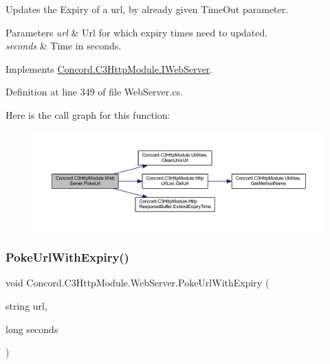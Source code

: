 Updates the Expiry of a url, by already given Time\+Out parameter. 


\begin{DoxyParams}{Parameters}
{\em url} & Url for which expiry times need to updated.\\
\hline
{\em seconds} & Time in seconds.\\
\hline
\end{DoxyParams}


Implements \mbox{\hyperlink{interface_concord_1_1_c3_http_module_1_1_i_web_server_a54d1254c7264250739d47175c1d1929d}{Concord.\+C3\+Http\+Module.\+I\+Web\+Server}}.



Definition at line 349 of file Web\+Server.\+cs.

Here is the call graph for this function\+:
\nopagebreak
\begin{figure}[H]
\begin{center}
\leavevmode
\includegraphics[width=350pt]{class_concord_1_1_c3_http_module_1_1_web_server_ad58516396d74972ad8f1005c889e1379_cgraph}
\end{center}
\end{figure}
\mbox{\label{class_concord_1_1_c3_http_module_1_1_web_server_ad3121bff4e1aeaeb05a5f1636d1e7d65}} 
\subsubsection{\texorpdfstring{PokeUrlWithExpiry()}{PokeUrlWithExpiry()}}
{\footnotesize\ttfamily void Concord.\+C3\+Http\+Module.\+Web\+Server.\+Poke\+Url\+With\+Expiry (\begin{DoxyParamCaption}\item[{string}]{url,  }\item[{long}]{seconds }\end{DoxyParamCaption})\hspace{0.3cm}{\ttfamily [inline]}}



